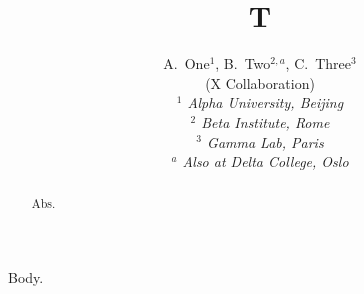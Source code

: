 \documentclass[aps,prd,superscriptaddress]{revtex4-1}
\begin{document}
\title{T}
\author{
		\begin{center}
	A.~One$^{1}$, B.~Two$^{2,a}$, C.~Three$^{3}$
	\\
		(X Collaboration)\\
		\vspace{0.2cm} {\it
	$^{1}$ Alpha University, Beijing\\$^{2}$ Beta Institute, Rome\\$^{3}$ Gamma Lab, Paris\\
		$^{a}$ Also at Delta College, Oslo\\
		}\end{center}
		\vspace{0.4cm}
}
\begin{abstract}Abs.\end{abstract}
\maketitle
Body.
\end{document}
